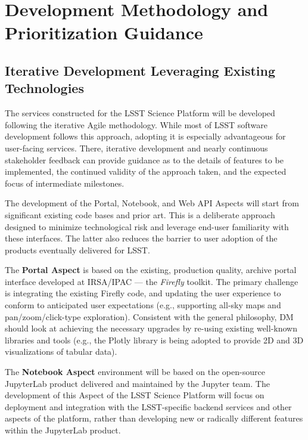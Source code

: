 \section{Development Methodology and Prioritization Guidance\label{sec:methdology}}

\subsection{Iterative Development Leveraging Existing Technologies }

The services constructed for the LSST Science Platform will be developed following the iterative Agile methodology. While most of LSST software development follows this approach, adopting it is especially advantageous for user-facing services. There, iterative development and nearly continuous stakeholder feedback can provide guidance as to the details of features to be implemented, the continued validity of the approach taken, and the expected focus of intermediate milestones.

The development of the Portal, Notebook, and Web API Aspects will start from significant existing code bases and prior art.
This is a deliberate approach designed to minimize technological risk and leverage end-user familiarity with these interfaces.
The latter also reduces the barrier to user adoption of the products eventually delivered for LSST.

The \textbf{Portal Aspect} is based on the existing, production quality, archive portal interface developed at IRSA/IPAC --- the \emph{Firefly} toolkit.
The primary challenge is integrating the existing Firefly code, and updating the user experience to conform to anticipated user expectations (e.g., supporting all-sky maps and pan/zoom/click-type exploration).
Consistent with the general philosophy, DM should look at achieving the necessary upgrades by re-using existing well-known libraries and tools (e.g., the Plotly library is being adopted to provide 2D and 3D visualizations of tabular data).

The \textbf{Notebook Aspect} environment will be based on the open-source JupyterLab product delivered and maintained by the Jupyter team.
The development of this Aspect of the LSST Science Platform will focus on deployment and integration with the LSST-specific backend services and other aspects of the platform, rather than developing new or radically different features within the JupyterLab product.

